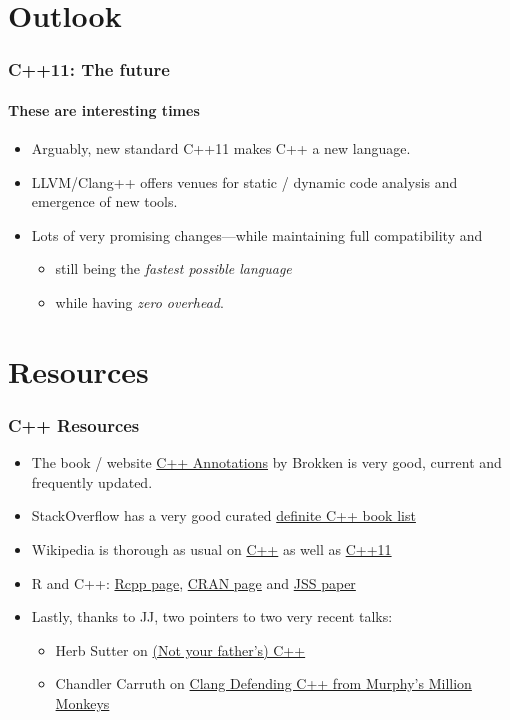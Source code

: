 \documentclass[dvipsnames,compress,pdflatex,beamer]{beamer}
\begin{document}
\section{Outlook}
\begin{frame}
  \frametitle{C++11: The future}
  \framesubtitle{These are interesting times}

  \begin{itemize}[<+->]
  \item Arguably, new standard C++11 makes C++ a new language.
  \item LLVM/Clang++ offers venues for static / dynamic code
    analysis and emergence of new tools.
  \item Lots of very promising changes---while maintaining full
    compatibility and 
    \begin{itemize}
      \item still being the \emph{fastest possible language} 
      \item while having \emph{zero overhead}.
    \end{itemize}
  \end{itemize}
\end{frame}  

\section{Resources}
\begin{frame}
  \frametitle{C++ Resources}
  \begin{itemize}
  \item The book / website
    \href{http://www.icce.rug.nl/documents/cplusplus/}{C++ Annotations} by
    Brokken is very good, current and frequently updated.
  \item StackOverflow has a very good curated
    \href{http://stackoverflow.com/questions/388242/the-definitive-c-book-guide-and-list}{definite C++ book list}
  \item Wikipedia is thorough as usual on
    \href{http://en.wikipedia.org/wiki/C\%2B\%2B}{C++} as well as 
    \href{http://en.wikipedia.org/wiki/C\%2B\%2B11}{C++11}
  \item R and C++: 
    \href{http://dirk.eddelbuettel.com/code/rcpp.html}{Rcpp page}, 
    \href{http://cran.r-project.org/package=Rcpp}{CRAN page} and 
    \href{http://www.jstatsoft.org/v40/i08/}{JSS paper}
  \item Lastly, thanks to JJ, two pointers to two very recent talks: 
    \begin{itemize}
    \item Herb Sutter on \href{http://channel9.msdn.com/Events/Lang-NEXT/Lang-NEXT-2012/-Not-Your-Father-s-C-}{(Not your father's) C++}
    \item Chandler Carruth on \href{http://channel9.msdn.com/Events/GoingNative/GoingNative-2012/Clang-Defending-C-from-Murphy-s-Million-Monkeys}{Clang Defending C++ from Murphy's Million Monkeys}
    \end{itemize}
  \end{itemize}
\end{frame}
\end{document}
